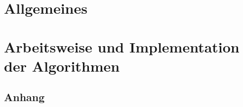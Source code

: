 \documentclass[11pt,a4paper]{scrreprt}
\begin{document}
\tableofcontents

\part{Allgemeines}



\part{Arbeitsweise und Implementation der Algorithmen}





\begin{appendix}
\part{Anhang}


\end{appendix}
\end{document}
